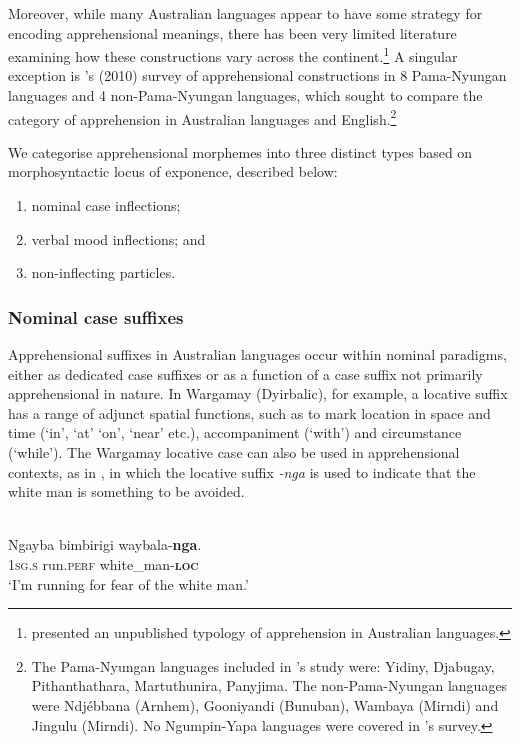 \documentclass[output=paper,colorlinks,citecolor=brown]{langscibook}
\begin{document}
Moreover, while many Australian languages appear to have some strategy for encoding apprehensional meanings, there has been very limited literature examining how these constructions vary across the continent.\footnote{\citet{gaby_expression_2017} presented an unpublished typology of apprehension in Australian languages.} A singular exception is \citeauthor{zester_semantics_2010}'s (2010) survey of apprehensional constructions in 8 Pama-Nyungan languages and 4 non-Pama-Nyungan languages, which sought to compare the category of apprehension in Australian languages and English.\footnote{The Pama-Nyungan languages included in \citeauthor{zester_semantics_2010}'s study were: Yidiny, Djabugay, Pithanthathara, Martuthunira, Panyjima. The non-Pama-Nyungan languages were Ndjébbana (Arnhem), Gooniyandi (Bunuban), Wambaya (Mirndi) and Jingulu (Mirndi). No Ngumpin-Yapa languages were covered in \citeauthor{zester_semantics_2010}'s survey.} 

We categorise apprehensional morphemes into three distinct types based on morphosyntactic locus of exponence, described below:
\begin{enumerate}
\itemsep-0.2cm
    \item nominal case inflections;
    \item verbal mood inflections; and
    \item non-inflecting particles.
\end{enumerate}

\subsubsection{Nominal case suffixes}

\noindent Apprehensional suffixes in Australian languages occur within nominal paradigms, either as dedicated case suffixes or as a function of a case suffix not primarily apprehensional in nature. In Wargamay (Dyirbalic), for example, a locative suffix has a range of adjunct spatial functions, such as to mark location in space and time (`in', `at' `on', `near' etc.), accompaniment (`with') and circumstance (`while'). The Wargamay locative case can also be used in apprehensional contexts, as in , in which the locative suffix \textit{-nga} is used to indicate that the white man is something to be avoided.

\ea
{} {\citealt[30]{dixon_wargamay_1981}} \\
\gll Ngayba bimbirigi waybala-\textbf{nga}. \\
\textsc{1sg.s} run.\textsc{perf} {white\_man-\textsc{\textbf{loc}}} \\
\glt `I'm running for fear of the white man.' 
\label{ex:bro3}
\z
\end{document}

